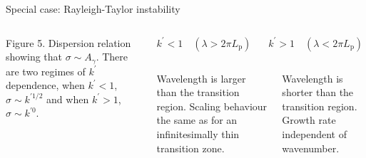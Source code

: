 \documentclass[final]{beamer} %
\begin{document}
\begin{frame}[t]
\begin{block}{Special case: Rayleigh-Taylor instability}
\begin{columns}[t]
\begin{column}{0.3\paperwidth}
        \vspace{-0.8cm}

        \centering \footnotesize Figure 5. Dispersion relation showing that $\sigma \sim A_{\gamma}$. There are two regimes of $k^{\prime}$ dependence, when $k^{\prime} < 1$, $\sigma \sim k^{\prime 1/2}$ and when $k^{\prime} > 1$, $\sigma \sim k^{\prime 0}$. 
      \end{column}

      \begin{column}{0.3\paperwidth}

        \vspace{1cm}
        
        \begin{columns}[c]
          
          \begin{column}{0.15\paperwidth}

            \centering $k^{\prime} < 1 \quad (\lambda > 2 \pi L_{\text{p}})$

          \end{column}

          \begin{column}{0.15\paperwidth}

            \centering $k^{\prime} > 1 \quad (\lambda < 2 \pi L_{\text{p}})$

          \end{column}
        \end{columns}

        \vspace{1cm}

        \begin{columns}[c]
          
          \begin{column}{0.15\paperwidth}

            \centering Wavelength is larger than the transition region. Scaling behaviour the same as for an infinitesimally thin transition zone. \\

          \end{column}

          \begin{column}{0.15\paperwidth}

            \centering Wavelength is shorter than the transition region. Growth rate independent of wavenumber. \\

          \end{column}
        \end{columns}


\end{column}
\end{columns}
\end{block}
\end{frame}
\end{document}
